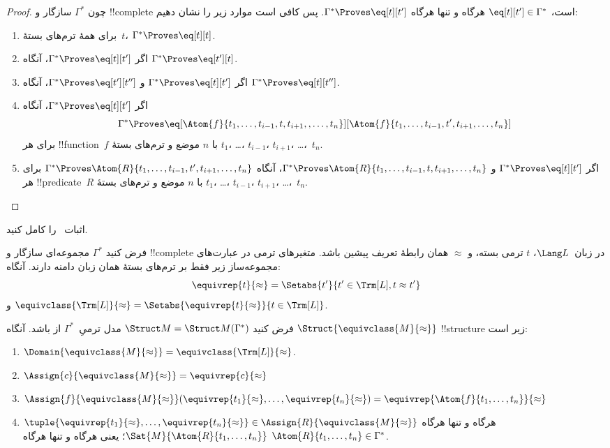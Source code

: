 \documentclass[../../../include/open-logic-section]{subfiles}
\begin{document}
\begin{proof}
چون $\Gamma^*$ سازگار و !!{complete} است، $\eq[t][t'] \in \Gamma^*$
هرگاه و تنها هرگاه $\Gamma^* \Proves \eq[t][t']$. پس کافی است موارد زیر
را نشان دهیم:
\begin{enumerate}
\item برای همهٔ ترم‌های بستهٔ~$t$، $\Gamma^* \Proves \eq[t][t]$.
\item اگر $\Gamma^* \Proves \eq[t][t']$، آنگاه
$\Gamma^* \Proves \eq[t'][t]$.
\item اگر $\Gamma^* \Proves \eq[t][t']$ و
$\Gamma^* \Proves \eq[t'][t'']$، آنگاه
$\Gamma^* \Proves \eq[t][t'']$.
\item اگر $\Gamma^* \Proves \eq[t][t']$، آنگاه
\[
\Gamma^* \Proves
\eq[\Atom{f}{t_1,\dots,t_{i-1},t,t_{i+1},,\dots,t_n}][\Atom{f}{t_1,\dots,t_{i-1},t',t_{i+1},\dots,t_n}]
\]
برای هر !!{function}~$f$ با $n$ موضع و ترم‌های بستهٔ $t_1$، \dots،
$t_{i-1}$، $t_{i+1}$، \dots،~$t_n$.
\item اگر $\Gamma^* \Proves \eq[t][t']$ و
$\Gamma^* \Proves
\Atom{R}{t_1,\dots,t_{i-1},t,t_{i+1},\dots,t_n}$، آنگاه
$\Gamma^* \Proves \Atom{R}{t_1,\dots,t_{i-1},t',t_{i+1},\dots,t_n}$
برای هر !!{predicate}~$R$ با $n$ موضع و ترم‌های بستهٔ $t_1$، \dots،
$t_{i-1}$، $t_{i+1}$، \dots،~$t_n$.
\end{enumerate}
\end{proof}

\begin{prob}
اثبات~ را کامل کنید.
\end{prob}

\begin{defn}
فرض کنید $\Gamma^*$ مجموعه‌ای سازگار و !!{complete} در زبان~$\Lang L$،
$t$ ترمی بسته، و $\approx$ همان رابطهٔ تعریف پیشین باشد. متغیرهای ترمی
در عبارت‌های مجموعه‌ساز زیر فقط بر ترم‌های بستهٔ همان زبان دامنه دارند.
آنگاه:
\[
\equivrep{t}{\approx} = \Setabs{t'}{t'\in \Trm[L], t \approx t'}
\]
و $\equivclass{\Trm[L]}{\approx} = \Setabs{\equivrep{t}{\approx}}{t \in \Trm[L]}$.
\end{defn}

\begin{defn}
فرض کنید $\Struct M = \Struct M(\Gamma^*)$ مدل ترمیِ~$\Gamma^*$ از
 باشد. آنگاه
$\Struct{\equivclass{M}{\approx}}$ !!{structure} زیر است:
\begin{enumerate}
\item $\Domain{\equivclass{M}{\approx}} = \equivclass{\Trm[L]}{\approx}$.
\item $\Assign{c}{\equivclass{M}{\approx}} = \equivrep{c}{\approx}$
\item $\Assign{f}{\equivclass{M}{\approx}}(\equivrep{t_1}{\approx}, \dots,
  \equivrep{t_n}{\approx}) = \equivrep{\Atom{f}{t_1,\dots, t_n}}{\approx}$
\item $\tuple{\equivrep{t_1}{\approx}, \dots, \equivrep{t_n}{\approx}} \in
  \Assign{R}{\equivclass{M}{\approx}}$ هرگاه و تنها هرگاه
  $\Sat{M}{\Atom{R}{t_1,\dots, t_n}}$؛ یعنی هرگاه و تنها هرگاه
  $\Atom{R}{t_1,\dots, t_n} \in \Gamma^*$.
\end{enumerate}
\end{defn}
\end{document}
